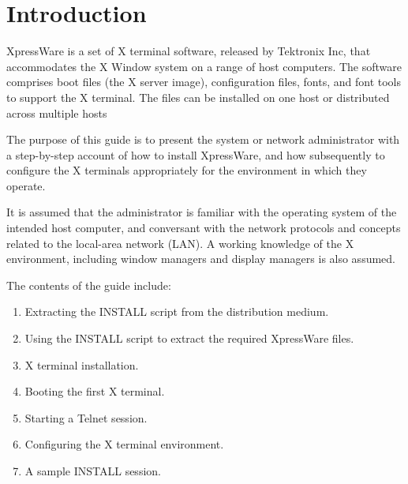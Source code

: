\documentclass[11pt]{article}
\newcommand{\stardocinitials}  {SSN}
\newcommand{\stardocnumber}    {36.1}
\newcommand{\stardocname}{\stardocinitials /\stardocnumber}
\newenvironment{latexonly}{}{}
\begin{document}
 \begin{latexonly}
    \setlength{\parskip}{0mm}
    \tableofcontents
    \setlength{\parskip}{\medskipamount}
    \markright{\stardocname}
 \end{latexonly}


\clearpage

\section {Introduction}

XpressWare is a set of X terminal software, released by Tektronix Inc, that
accommodates the X Window system on a range of host computers. The software
comprises boot files (the X server image), configuration files, fonts, and
font tools to support the X terminal. The files can be installed on one host
or distributed across multiple hosts

The purpose of this guide is to present the system or network administrator
with a step-by-step account of how to install XpressWare, and how subsequently
to configure the X terminals appropriately for the environment in which they
operate.

It is assumed that the administrator is familiar with the operating system of
the intended host computer, and conversant with the network protocols and
concepts related to the local-area network (LAN). A working knowledge of the
X environment, including window managers and display managers is also assumed.

The contents of the guide include:

\begin {enumerate}

\item Extracting the INSTALL script from the distribution medium.

\item Using the INSTALL script to extract the required XpressWare files.

\item X terminal installation.

\item Booting the first X terminal.

\item Starting a Telnet session.

\item Configuring the X terminal environment.

\item A sample INSTALL session.

\end {enumerate}
\end{document}
